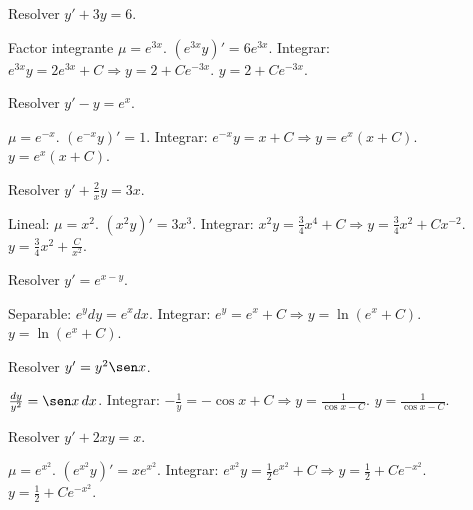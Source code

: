 \begin{prob}
Resolver \(y' + 3y = 6\).
\begin{myproof}
Factor integrante \(\mu=e^{3x}\). \((e^{3x}y)'=6e^{3x}\). Integrar: \(e^{3x}y=2e^{3x}+C \Rightarrow y=2+Ce^{-3x}\). \(\boxed{y=2+Ce^{-3x}}\).
\end{myproof}
\end{prob}

\begin{prob}
Resolver \(y' - y = e^x\).
\begin{myproof}
\(\mu=e^{-x}\). \((e^{-x}y)'=1\). Integrar: \(e^{-x}y=x+C \Rightarrow y=e^x(x+C)\). \(\boxed{y=e^x(x+C)}\).
\end{myproof}
\end{prob}

\begin{prob}
Resolver \(y' + \frac{2}{x}y = 3x\).
\begin{myproof}
Lineal: \(\mu=x^2\). \((x^2 y)'=3x^3\). Integrar: \(x^2 y = \frac{3}{4}x^4 + C \Rightarrow y = \frac{3}{4}x^2 + Cx^{-2}\). \(\boxed{y = \frac{3}{4}x^2 + \frac{C}{x^2}}\).
\end{myproof}
\end{prob}

\begin{prob}
Resolver \(y' = e^{x-y}\).
\begin{myproof}
Separable: \(e^y dy = e^x dx\). Integrar: \(e^y = e^x + C \Rightarrow y = \ln(e^x+C)\). \(\boxed{y = \ln(e^x+C)}\).
\end{myproof}
\end{prob}

\begin{prob}
Resolver \(y' = y^2 \sen x\).
\begin{myproof}
\(\frac{dy}{y^2} = \sen x\,dx\). Integrar: \(-\frac{1}{y} = -\cos x + C \Rightarrow y = \frac{1}{\cos x - C}\). \(\boxed{y = \frac{1}{\cos x - C}}\).
\end{myproof}
\end{prob}

\begin{prob}
Resolver \(y' + 2xy = x\).
\begin{myproof}
\(\mu = e^{x^2}\). \((e^{x^2}y)' = x e^{x^2}\). Integrar: \(e^{x^2}y = \frac{1}{2}e^{x^2} + C \Rightarrow y = \frac{1}{2} + Ce^{-x^2}\). \(\boxed{y = \frac{1}{2} + Ce^{-x^2}}\).
\end{myproof}
\end{prob}

